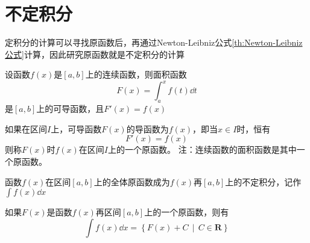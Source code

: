 \section{不定积分}
定积分的计算可以寻找原函数后，再通过Newton-Leibniz公式\ref{th:Newton-Leibniz公式}计算，因此研究原函数就是不定积分的计算
\begin{definition}
    设函数$f(x)$是$[a,b]$上的连续函数，则面积函数
    \[ F(x) = \int_a^x f(t)\dd{t} \]
    是$[a,b]$上的可导函数，且$F'(x)=f(x)$
\end{definition}
\begin{definition}
    如果在区间$I$上，可导函数$F(x)$的导函数为$f(x)$，即当$x\in I$时，恒有
    \[ F'(x) = f(x) \]
    则称$F(x)$时$f(x)$在区间$I$上的一个原函数。
    注：连续函数的面积函数是其中一个原函数。
\end{definition}
\begin{definition}
    函数$f(x)$在区间$[a,b]$上的全体原函数成为$f(x)$再$[a,b]$上的不定积分，记作$\int f(x)\dd{x}$

    如果$F(x)$是函数$f(x)$再区间$[a,b]$上的一个原函数，则有
    \[\int f(x)\dd{x} = \left\{F(x)+C \,\middle|\, C\in\mathbf{R} \right\} \]
\end{definition}


